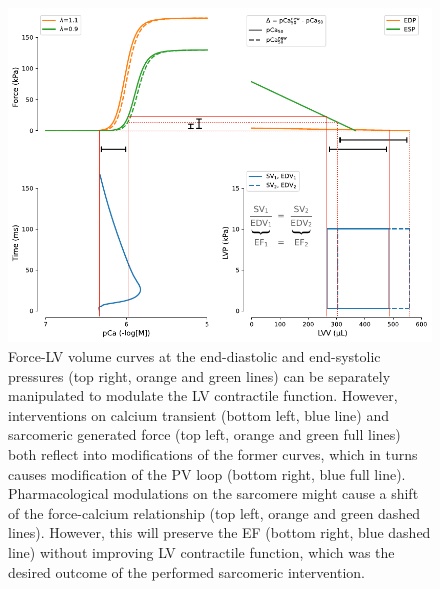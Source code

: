 \begin{figure}[h!]
    \myfloatalign
    \includegraphics[width=\textwidth]{figures/chapter08/Fig7.pdf}
    \caption{Force-LV volume curves at the end-diastolic and end-systolic pressures (top right, orange and green lines) can be separately manipulated to modulate the LV contractile function. However, interventions on calcium transient (bottom left, blue line) and sarcomeric generated force (top left, orange and green full lines) both reflect into modifications of the former curves, which in turns causes modification of the PV loop (bottom right, blue full line). Pharmacological modulations on the sarcomere might cause a shift of the force-calcium relationship (top left, orange and green dashed lines). However, this will preserve the EF (bottom right, blue dashed line) without improving LV contractile function, which was the desired outcome of the performed sarcomeric intervention.}
    \label{fig:schematic}
\end{figure}

\vspace{0.2cm}\noindent
{}

